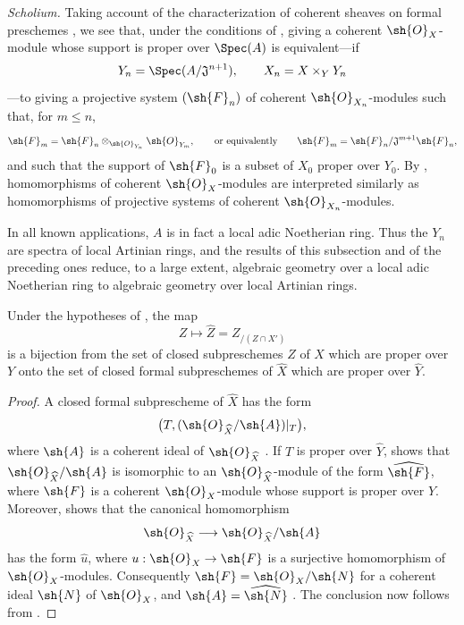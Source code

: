 \begin{env}[5.1.7]
\label{III.5.1.7}
\emph{Scholium.}
Taking account of the characterization of coherent sheaves on
formal preschemes , we see that, under the
conditions of , giving a coherent
$\sh{O}_X$-module whose support is proper over $\Spec(A)$ is
equivalent---if
\[
  Y_n=\Spec(A/\mathfrak{J}^{n+1}),\qquad
  X_n=X\times_Y Y_n
\]
---to giving a projective system $(\sh{F}_n)$ of coherent
$\sh{O}_{X_n}$-modules such that, for $m\leq n$,
\[
  \sh{F}_m
  =
  \sh{F}_n\otimes_{\sh{O}_{Y_n}}\sh{O}_{Y_m},
  \qquad\text{or equivalently}\qquad
  \sh{F}_m
  =
  \sh{F}_n/\mathfrak{J}^{m+1}\sh{F}_n,
\]
and such that the support of $\sh{F}_0$ is a subset of $X_0$
proper over $Y_0$.  By , homomorphisms of
coherent $\sh{O}_X$-modules are interpreted similarly as
homomorphisms of projective systems of coherent
$\sh{O}_{X_n}$-modules.


In all known applications, $A$ is in fact a local adic Noetherian
ring.  Thus the $Y_n$ are spectra of local Artinian rings, and the
results of this subsection and of the preceding ones reduce, to a
large extent, algebraic geometry over a local adic Noetherian ring
to algebraic geometry over local Artinian rings.
\end{env}

\begin{corollary}[5.1.8]
\label{III.5.1.8}
Under the hypotheses of , the map
\[
  Z\longmapsto\widehat{Z}=Z_{/(Z\cap X')}
\]
is a bijection from the set of closed subpreschemes $Z$ of $X$
which are proper over $Y$ onto the set of closed formal
subpreschemes of $\widehat{X}$ which are proper over
$\widehat{Y}$.
\end{corollary}

\begin{proof}
A closed formal subprescheme of $\widehat{X}$ has the form
\[
  \bigl(T,
    (\sh{O}_{\widehat{X}}/\sh{A})|_T\bigr),
\]
where $\sh{A}$ is a coherent ideal of
$\sh{O}_{\widehat{X}}$ .  If $T$ is proper over
$\widehat{Y}$,  shows that
$\sh{O}_{\widehat{X}}/\sh{A}$ is isomorphic to an
$\sh{O}_{\widehat{X}}$-module of the form
$\widehat{\sh{F}}$, where $\sh{F}$ is a coherent
$\sh{O}_X$-module whose support is proper over $Y$.  Moreover,
 shows that the canonical homomorphism
\[
  \sh{O}_{\widehat{X}}
  \longrightarrow
  \sh{O}_{\widehat{X}}/\sh{A}
\]
has the form $\widehat{u}$, where
$u:\sh{O}_X\to\sh{F}$ is a surjective homomorphism of
$\sh{O}_X$-modules.  Consequently
$\sh{F}=\sh{O}_X/\sh{N}$ for a coherent ideal $\sh{N}$ of
$\sh{O}_X$, and
$\sh{A}=\widehat{\sh{N}}$ .  The conclusion now
follows from .
\end{proof}


